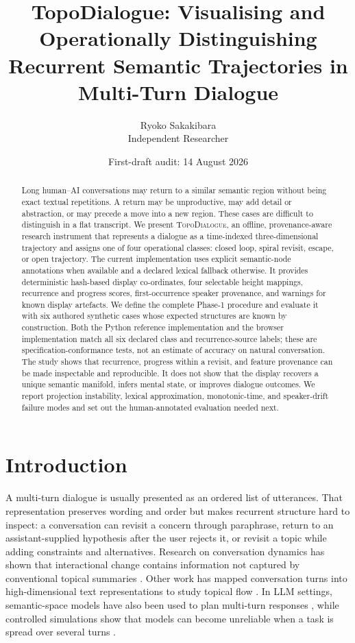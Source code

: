\documentclass[11pt]{article}
\title{TopoDialogue: Visualising and Operationally Distinguishing\\
Recurrent Semantic Trajectories in Multi-Turn Dialogue}
\author{Ryoko Sakakibara\\Independent Researcher}
\date{First-draft audit: 14 August 2026}
\newcommand{\system}{\textsc{TopoDialogue}}
\begin{document}
\maketitle

\begin{abstract}
Long human--AI conversations may return to a similar semantic region without
being exact textual repetitions. A return may be unproductive, may add detail or
abstraction, or may precede a move into a new region. These cases are difficult
to distinguish in a flat transcript. We present \system, an offline,
provenance-aware research instrument that represents a dialogue as a
time-indexed three-dimensional trajectory and assigns one of four operational
classes: closed loop, spiral revisit, escape, or open trajectory. The current
implementation uses explicit semantic-node annotations when available and a
declared lexical fallback otherwise. It provides deterministic hash-based
display co-ordinates, four selectable height mappings, recurrence and progress
scores, first-occurrence speaker provenance, and warnings for known display
artefacts. We define the complete Phase-1 procedure and evaluate it with six
authored synthetic cases whose expected structures are known by construction.
Both the Python reference implementation and the browser implementation match
all six declared class and recurrence-source labels; these are
specification-conformance tests, not an estimate of accuracy on natural
conversation. The study shows that recurrence, progress within a revisit, and
feature provenance can be made inspectable and reproducible. It does not show
that the display recovers a unique semantic manifold, infers mental state, or
improves dialogue outcomes. We report projection instability, lexical
approximation, monotonic-time, and speaker-drift failure modes and set out the
human-annotated evaluation needed next.
\end{abstract}

\section{Introduction}

A multi-turn dialogue is usually presented as an ordered list of utterances.
That representation preserves wording and order but makes recurrent structure
hard to inspect: a conversation can revisit a concern through paraphrase, return
to an assistant-supplied hypothesis after the user rejects it, or revisit a
topic while adding constraints and alternatives. Research on conversation
dynamics has shown that interactional change contains information not captured
by conventional topical summaries \citep{hua2024dynamics}. Other work has mapped
conversation turns into high-dimensional text representations to study topical
flow \citep{fischer2024trajectories}. In LLM settings, semantic-space models
have also been used to plan multi-turn responses \citep{chen2025scope}, while
controlled simulations show that models can become unreliable when a task is
spread over several turns \citep{laban2025lost}.
\end{document}
